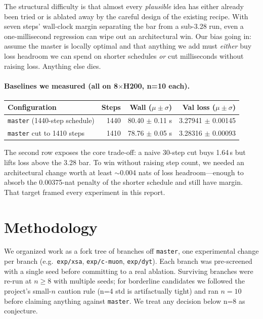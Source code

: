 \documentclass[10pt,letterpaper]{article}
\newcommand{\code}[1]{\texttt{\small #1}}
\begin{document}
The structural difficulty is that almost every \emph{plausible} idea has either already been tried or is ablated away by the careful design of the existing recipe. With seven steps' wall-clock margin separating the bar from a sub-3.28 run, even a one-millisecond regression can wipe out an architectural win. Our bias going in: assume the master is locally optimal and that anything we add must \emph{either} buy loss headroom we can spend on shorter schedules \emph{or} cut milliseconds without raising loss. Anything else dies.

\paragraph{Baselines we measured (all on 8\(\times\)H200, n=10 each).}
\begin{center}
\small
\begin{tabular}{lrrr}
\toprule
Configuration & Steps & Wall ($\mu \pm \sigma$) & Val loss ($\mu \pm \sigma$) \\
\midrule
\code{master} (1440-step schedule) & 1440 & 80.40 \(\pm\) 0.11 s & 3.27941 \(\pm\) 0.00145 \\
\code{master} cut to 1410 steps    & 1410 & 78.76 \(\pm\) 0.05 s & 3.28316 \(\pm\) 0.00093 \\
\bottomrule
\end{tabular}
\end{center}

The second row exposes the core trade-off: a naive 30-step cut buys 1.64\,s but lifts loss above the 3.28 bar. To win without raising step count, we needed an architectural change worth at least $\sim$0.004 nats of loss headroom---enough to absorb the 0.00375-nat penalty of the shorter schedule and still have margin. That target framed every experiment in this report.

\section{Methodology}
\label{sec:method}

We organized work as a fork tree of branches off \code{master}, one experimental change per branch (e.g.\ \code{exp/xsa}, \code{exp/c-muon}, \code{exp/dyt}). Each branch was pre-screened with a single seed before committing to a real ablation. Surviving branches were re-run at $n \ge 8$ with multiple seeds; for borderline candidates we followed the project's small-$n$ caution rule (n=4 std is artifactually tight) and ran $n=10$ before claiming anything against \code{master}. We treat any decision below n=8 as conjecture.
\end{document}
